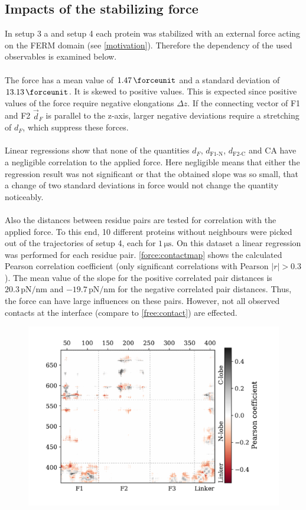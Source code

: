 \subsection{Impacts of the stabilizing force}
\label{forceana}
In setup 3 a and setup 4 each protein was stabilized with an external force acting on the FERM domain (see \autoref{motivation}). Therefore the dependency of the used observables is examined below.\\
\\
The force has a mean value of $1.47\,\forceunit$ and a standard deviation of $13.13\,\forceunit$. It is skewed to positive values. This is expected since positive values of the force require negative elongations $\Delta z$. If the connecting vector of F1 and F2 $\vec{d}_F$ is parallel to the z-axis, larger negative deviations require a stretching of $d_F$, which suppress these forces. \\
\\
Linear regressions show that none of the quantities $d_F$, $d_\text{F1-N}$, $d_\text{F2-C}$ and CA have a negligible correlation to the applied force. Here negligible means that either the regression result was not significant or that the obtained slope was so small, that a change of two standard deviations in force would not change the quantity noticeably.\\
\\
Also the distances between residue pairs are tested for correlation with the applied force. To this end, 10 different proteins without neighbours were picked out of the trajectories of setup 4, each for $1\,\si{\micro\second}$. On this dataset a linear regression was performed for each residue pair. \autoref{force:contactmap} shows the calculated Pearson correlation coefficient (only significant correlations with Pearson $\left|r\right| > 0.3$). The mean value of the slope for the positive correlated pair distances is $20.3\,\si{\pico\newton/\nano\metre}$ and $-19.7\,\si{\pico\newton/\nano\metre}$ for the negative correlated pair distances. Thus, the force can have large influences on these pairs. However, not all observed contacts at the interface (compare to \autoref{free:contact}) are effected.
%
%
%
\begin{figure}
	\centering
	\includegraphics[width=.7\textwidth]{figures/results/interface_corr}
	\label{force:contactmap}
\end{figure}
